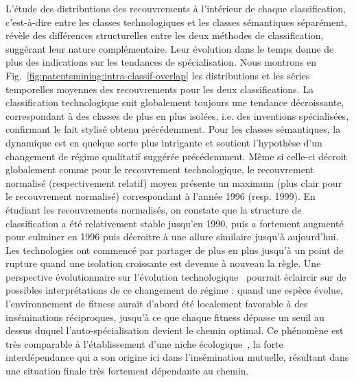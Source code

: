 {L'étude des distributions des recouvrements à l'intérieur de chaque classification, c'est-à-dire entre les classes technologiques et les classes sémantiques séparément, révèle des différences structurelles entre les deux méthodes de classification, suggérant leur nature complémentaire. Leur évolution dans le temps donne de plus des indications sur les tendances de spécialisation. Nous montrons en Fig.~\ref{fig:patentsmining:intra-classif-overlap} les distributions et les séries temporelles moyennes des recouvrements pour les deux classifications. La classification technologique suit globalement toujours une tendance décroissante, correspondant à des classes de plus en plus isolées, i.e. des inventions spécialisées, confirmant le fait stylisé obtenu précédemment. Pour les classes sémantiques, la dynamique est en quelque sorte plus intrigante et soutient l'hypothèse d'un changement de régime qualitatif suggérée précédemment. Même si celle-ci décroit globalement comme pour le recouvrement technologique, le recouvrement normalisé (respectivement relatif) moyen présente un maximum (plus clair pour le recouvrement normalisé) correspondant à l'année 1996 (resp. 1999). En étudiant les recouvrements normalisés, on constate que la structure de classification a été relativement stable jusqu'en 1990, puis a fortement augmenté pour culminer en 1996 puis décroitre à une allure similaire jusqu'à aujourd'hui. Les technologies ont commencé par partager de plus en plus jusqu'à un point de rupture quand une isolation croissante est devenue à nouveau la règle. Une perspective évolutionnaire sur l'évolution technologique~\cite{ziman2003technological} pourrait éclaircir sur de possibles interprétations de ce changement de régime : quand une espèce évolue, l'environnement de fitness aurait d'abord été localement favorable à des inséminations réciproques, jusqu'à ce que chaque fitness dépasse un seuil au dessus duquel l'auto-spécialisation devient le chemin optimal. Ce phénomène est très comparable à l'établissement d'une niche écologique~\cite{holland2012signals}, la forte interdépendance qui a son origine ici dans l'insémination mutuelle, résultant dans une situation finale très fortement dépendante au chemin.
}


